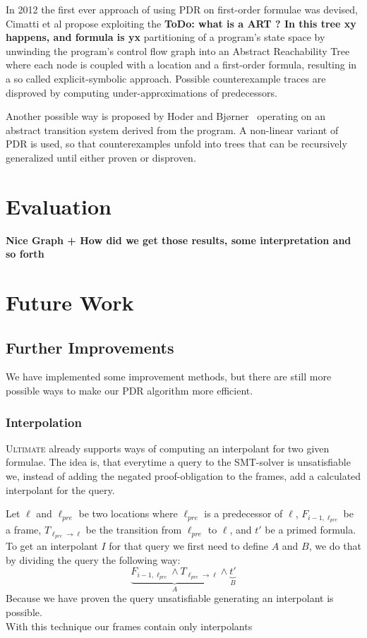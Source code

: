 \documentclass[11pt, a4paper, BCOR=10mm, ngerman]{scrbook}
\begin{document}
In 2012 the first ever approach of using PDR on first-order formulae was devised, Cimatti et al \cite{DBLP:conf/cav/CimattiG12} propose exploiting the \textbf{ToDo: what is a ART ? In this tree xy happens, and formula is yx} partitioning of a program's state space by unwinding the program's control flow graph into an Abstract Reachability Tree where each node is coupled with a location and a first-order formula, resulting in a so called explicit-symbolic approach. Possible counterexample traces are disproved by computing under-approximations of predecessors. 

Another possible way is proposed by Hoder and Bj{\o}rner~\cite{DBLP:conf/sat/HoderB12} operating on an abstract transition system derived from the program. A non-linear variant of PDR is used, so that counterexamples unfold into trees that can be recursively generalized until either proven or disproven.





\chapter{Evaluation}
\textbf{Nice Graph + How did we get those results, some interpretation and so forth}


\chapter{Future Work}
\section{Further Improvements}
We have implemented some improvement methods, but there are still more possible ways to make our PDR algorithm more efficient.

\subsection{Interpolation}
\textsc{Ultimate} already supports ways of computing an interpolant for two given formulae. The idea is, that everytime a query to the SMT-solver is unsatisfiable we, instead of adding the negated proof-obligation to the frames, add a calculated interpolant for the query. \par
Let $\ell$ and $\ell_{pre}$ be two locations where $\ell_{pre}$ is a predecessor of $\ell$, $F_{i - 1, \ell_{pre}}$ be a frame, $T_{\ell_{pre} \rightarrow \ell}$ be the transition from $\ell_{pre}$ to $\ell$, and $t'$ be a primed formula. \\
To get an interpolant $I$ for that query we first need to define $A$ and $B$, we do that by dividing the query the following way:
\begin{equation*}
\underbrace{F_{i - 1, \ell_{pre}} \land T_{\ell_{pre} \rightarrow \ell}}_{A} \land \underbrace{t'}_B
\end{equation*}
Because we have proven the query unsatisfiable generating an interpolant is possible. \\
With this technique our frames contain only interpolants
\end{document}
